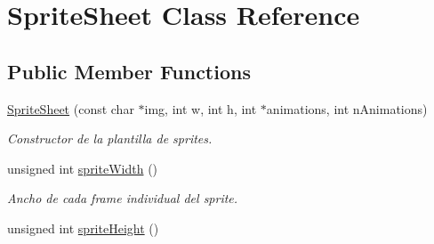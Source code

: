 \hypertarget{class_sprite_sheet}{\section{Sprite\-Sheet Class Reference}
\label{class_sprite_sheet}
}
\subsection*{Public Member Functions}
\begin{DoxyCompactItemize}
\item 
\hyperlink{class_sprite_sheet_a7271cbaa0719a4d5675ee8e94f85aa56}{Sprite\-Sheet} (const char $\ast$img, int w, int h, int $\ast$animations, int n\-Animations)
\begin{DoxyCompactList}\small\item\em Constructor de la plantilla de sprites. \end{DoxyCompactList}\item 
\hypertarget{class_sprite_sheet_a54a4dee6f85eb69fa699477764377d70}{unsigned int \hyperlink{class_sprite_sheet_a54a4dee6f85eb69fa699477764377d70}{sprite\-Width} ()}\label{class_sprite_sheet_a54a4dee6f85eb69fa699477764377d70}

\begin{DoxyCompactList}\small\item\em Ancho de cada frame individual del sprite. \end{DoxyCompactList}\item 
\hypertarget{class_sprite_sheet_add41556b6575aa5ad6a4fedfa9b8e5d6}{unsigned int \hyperlink{class_sprite_sheet_add41556b6575aa5ad6a4fedfa9b8e5d6}{sprite\-Height} ()}\label{class_sprite_sheet_add41556b6575aa5ad6a4fedfa9b8e5d6}


\end{DoxyCompactItemize}
